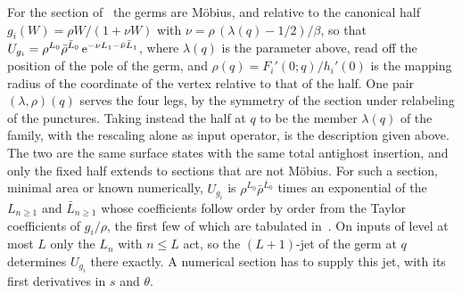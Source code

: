 \begin{enumerate}
    For the section of~\cite{Erbin:2026:SL2CVerticesClosed} the germs are Möbius, and relative to the canonical half $g_i(W) = \rho W / (1 + \nu W)$ with $\nu = \rho \, (\lambda(q) - 1 / 2) / \beta$, so that
    $U_{g_i} = \rho^{L_0} \bar\rho^{\bar L_0} \, \mathrm{e}^{- \nu L_1 - \bar\nu \bar L_1}$,
    where $\lambda(q)$ is the parameter above, read off the position of the pole of the germ, and $\rho(q) = F_i'(0; q) / h_i'(0)$ is the mapping radius of the coordinate of the vertex relative to that of the half.
    One pair $(\lambda, \rho)(q)$ serves the four legs, by the symmetry of the section under relabeling of the punctures.
    Taking instead the half at $q$ to be the member $\lambda(q)$ of the family, with the rescaling alone as input operator, is the description given above.
    The two are the same surface states with the same total antighost insertion, and only the fixed half extends to sections that are not Möbius.
    For such a section, minimal area or known numerically, $U_{g_i}$ is $\rho^{L_0} \bar\rho^{\bar L_0}$ times an exponential of the $L_{n \geq 1}$ and $\bar L_{n \geq 1}$ whose coefficients follow order by order from the Taylor coefficients of $g_i / \rho$, the first few of which are tabulated in~\cite{LeClair:1989:StringFieldTheory-1,Rastelli:2001:TachyonPotentialsStar}.
    On inputs of level at most $L$ only the $L_n$ with $n \leq L$ act, so the $(L + 1)$-jet of the germ at $q$ determines $U_{g_i}$ there exactly.
    A numerical section has to supply this jet, with its first derivatives in $s$ and $\theta$.


\end{enumerate}
